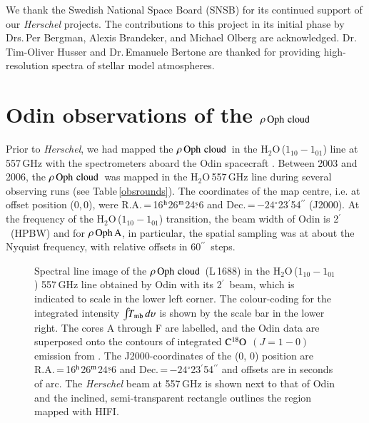 \documentclass{aa}
\newcommand{\water}{H$_{2}$O}
\newcommand{\roc}{$\rho \, {\rm Oph \,\, cloud}$}
\newcommand{\roa}{$\rho \, {\rm Oph \, A}$}
\newcommand{\amin}{$^{\prime}$}                   %
\newcommand{\asec}{$^{\prime \prime}$}
\newcommand{\radot}[4]{\mbox{#1$^{\rm h}$#2$^{\rm m}$#3$\stackrel {\rm s}{_{\bf\cdot}}$#4}}
\newcommand{\decdms}[3]{\mbox{#1$^{\circ}$#2$^{\prime}$#3$^{\prime \prime}$}}
\begin{document}

\begin{acknowledgement} 
We thank the Swedish National Space Board (SNSB)  for its continued support of  our {\it Herschel} projects.  The contributions to this project in its initial phase by Drs.\,Per Bergman, Alexis Brandeker, and Michael Olberg are acknowledged. Dr.\,Tim-Oliver Husser and Dr.\,Emanuele Bertone are thanked for providing high-resolution spectra of stellar model atmospheres.
\end{acknowledgement}




%
%
\appendix

\section{Odin observations of the \roc} 

Prior to {\it Herschel}, we had mapped the \roc\ in the \water\,($1_{10}-1_{01}$) line at 557\,GHz with the spectrometers aboard the Odin spacecraft \citep{frisk2003,nordh2003,olberg2003}.  Between 2003 and 2006, the \roc\ was mapped in the \water\,557\,GHz line during several observing runs (see Table\,\ref{obsrounds}). The coordinates of the map centre, i.e. at offset position (0,\,0), were R.A.\,=\,\radot{16}{26}{24}{6} and Dec.\,=\,\decdms{$-24$}{23}{54} (J2000). At the frequency of the \water\,($1_{10}-1_{01}$) transition, the beam width of Odin is 2\amin\ (HPBW) and for \roa, in particular, the spatial sampling was at about the Nyquist frequency, with relative offsets in 60\asec\ steps.

\begin{figure*}
  \caption{Spectral line image of the \roc\ (L\,1688) in the \water\,($1_{10}-1_{01}$) 557\,GHz line  obtained by Odin with its 2\amin\ beam, which is indicated to scale in the lower left corner. The colour-coding for the integrated intensity $\int \!\! T_{\rm mb}\,d\upsilon$ is shown by the scale bar in the lower right. The cores A through F are labelled, and the Odin data are superposed onto the contours of integrated $\rm C^{18}\rm O$ $(J=1-0)$ emission from \citet{umemoto2002}. The J2000-coordinates of the (0, 0) position are R.A.\,=\,\radot{16}{26}{24}{6} and Dec.\,=\,\decdms{$-24$}{23}{54} and offsets are in seconds of arc. The {\it Herschel} beam at 557\,GHz is shown next to that of Odin and the inclined, semi-transparent rectangle outlines the region mapped with HIFI.
        }
  \label{odin_map}
\end{figure*}
\end{document}
